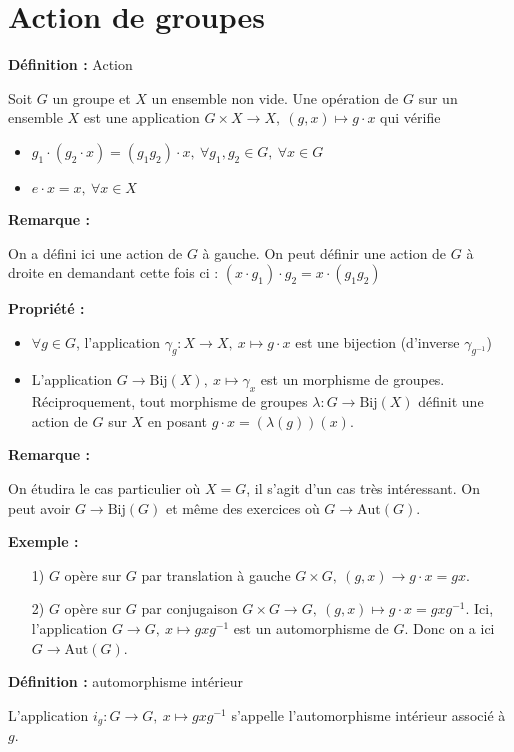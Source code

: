 \documentclass{report}
\newenvironment{definition}[1][]{
    \begin{tcolorbox}[colframe= white]
    \textbf{Définition :} 
    #1 \par
    }
    {\end{tcolorbox}}
\newenvironment{prop}{\begin{tcolorbox}[colframe= white]
    \textbf{Propriété :}
     \par}
    {\end{tcolorbox}}
\newenvironment{exemple}{\begin{tcolorbox}[colback=gray!10,colframe= white]
    \textbf{Exemple :}
     \par}
    {\end{tcolorbox}}
\newcommand{\remarque}{
    \noindent\textbf{Remarque :} \par
}
\newcommand{\jus}{\ju\vspace{0.5cm}}
\newcommand{\ju}{\justify}
\begin{document}
\section{Action de groupes}
\ju
\begin{definition}[Action] Soit $G$ un groupe et $X$ un ensemble non vide. Une opération de $G$ sur un ensemble $X$ est une application $G\times X\longrightarrow  X,\ (g,x)\mapsto  g\cdot x$
qui vérifie
\begin{itemize}
\item $g_1\cdot(g_2\cdot x)=(g_1g_2)\cdot x,\ \forall g_1,g_2\in G,\ \forall x\in G$
\item $e\cdot x=x,\ \forall x\in X$
\end{itemize}
\end{definition}
\ju 
\remarque{On a défini ici une action de $G$ à gauche. On peut définir une action de $G$ à droite en demandant cette fois ci : $(x\cdot g_1)\cdot g_2=x\cdot (g_1g_2)$}
\jus
\begin{prop}
\begin{itemize}
\item $\forall g\in G$, l'application $\gamma_g:X\longrightarrow  X,\ x\mapsto  g\cdot x$ est une bijection (d'inverse $\gamma_{g^{-1}}$)
\item L'application $G\longrightarrow \text{Bij}(X),\ x\mapsto  \gamma_x$ est un morphisme de groupes. Réciproquement, tout morphisme de groupes $\lambda:G\longrightarrow  \text{Bij}(X)$ définit une action de $G$ sur $X$ en posant $g\cdot x=(\lambda(g))(x)$.
\end{itemize}
\end{prop}
\jus
\remarque{On étudira le cas particulier où $X=G$, il s'agit d'un cas très intéressant. On peut avoir $G\longrightarrow \text{Bij}(G)$ et même des exercices où $G\longrightarrow \text{Aut}(G)$.}
\jus 
\begin{exemple}
\begin{itemize}
\item[1)] $G$ opère sur $G$ par translation à gauche $G\times G,\ (g,x)\longrightarrow  g\cdot x=gx$. 
\item[2)] $G$ opère sur $G$ par conjugaison  $G\times G\longrightarrow  G,\ (g,x)\mapsto  g\cdot x=gxg^{-1}$. Ici, l'application $G\longrightarrow  G,\ x\mapsto  gxg^{-1}$ est un automorphisme de $G$. Donc on a ici $G\longrightarrow  \text{Aut}(G)$. 
\end{itemize}
\end{exemple}
\jus 
\begin{definition}[automorphisme intérieur] 
L'application $i_g:G\longrightarrow  G,\ x\mapsto  gxg^{-1}$ s'appelle l'automorphisme intérieur associé à $g$. 
\end{definition}
\end{document}
